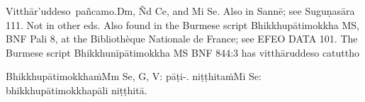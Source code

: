 Vitthār'uddeso pañcamo.\makeatletter\hyperlink{endnote-appendix}\makeatother Dm, Ñd Ce, and Mi Se. Also in  Sannē; see Suguṇasāra 111. Not in other eds. Also found in the Burmese script
Bhikkhupātimokkha MS, BNF Pali 8, at the Bibliothèque Nationale de France; see EFEO DATA 101. The Burmese script
Bhikkhunīpātimokkha MS BNF 844:3 has vitthāruddeso catuttho

\begin{outro}
	Bhikkhupātimokkhaṁ\makeatletter\hyperlink{endnote-appendix}\makeatother Mm Se, G, V: pāṭi-. niṭṭhitaṁ\makeatletter\hyperlink{endnote-appendix}\makeatother Mi Se: bhikkhupātimokkhapāli niṭṭhitā.
\end{outro}

\clearpage

